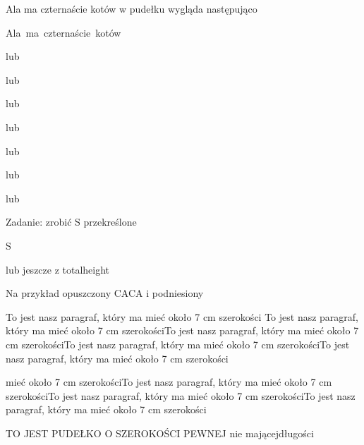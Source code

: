 \documentclass[a4paper]{article}
\begin{document}
Ala ma czternaście kotów w pudełku wygląda następująco

\mbox{Ala ma czternaście kotów}

lub


lub


lub


lub


lub


lub


lub




Zadanie: zrobić S przekreślone

\makebox[0pt][s]{/}S

lub jeszcze z totalheight








Na przykład opuszczony C\raisebox{-0.7ex}{Z}AC\raisebox{-0.7ex}{Z}A i 
podniesiony \raisebox{1ex}{Czarek}\\
\parbox[t]{5cm}{To jest nasz paragraf, który ma 
mieć około 7 cm szerokości To jest nasz paragraf, który ma 
mieć około 7 cm szerokościTo jest nasz paragraf, który ma 
mieć około 7 cm szerokościTo jest nasz paragraf, który ma 
mieć około 7 cm szerokościTo jest nasz paragraf, który ma 
mieć około 7 cm szerokości}
\begin{minipage}[t]{4cm}
mieć około 7 cm szerokościTo jest nasz paragraf, który ma 
mieć około 7 cm szerokościTo jest nasz paragraf, który ma 
mieć około 7 cm szerokościTo jest nasz paragraf, który ma 
mieć około 7 cm szerokości
\end{minipage}
\vspace{1cm}

\parbox{4cm}{TO JEST PUDEŁKO O SZEROKOŚCI PEWNEJ 
nie mającej\footnotemark długości}
\end{document}
